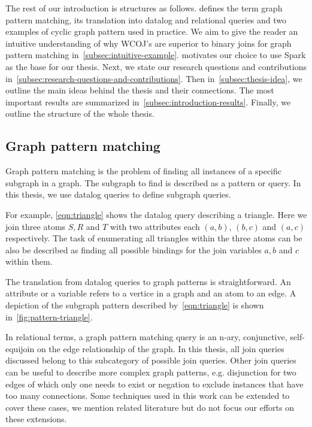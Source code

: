 The rest of our introduction is structures as follows.
 defines the term graph pattern matching, its translation into datalog and
relational queries and two examples of cyclic graph pattern used in practice.
We aim to give the reader an intuitive understanding of why \textsc{WCOJ}'s are superior to binary joins for graph pattern matching
in~\cref{subsec:intuitive-example}.
 motivates our choice to use Spark as the base for our thesis.
Next, we state our research questions and contributions in~\cref{subsec:research-questions-and-contributions}.
Then in~\cref{subsec:thesis-idea}, we outline the main ideas behind the thesis and their connections.
The most important results are summarized in~\cref{subsec:introduction-results}.
Finally, we outline the structure of the whole thesis.

\subsection{Graph pattern matching}\label{subsec:graph-pattern-matching}
Graph pattern matching is the problem of finding all instances of a specific subgraph in a graph.
The subgraph to find is described as a pattern or query.
In this thesis, we use datalog queries to define subgraph queries.

For example, \cref{eqn:triangle} shows the datalog query describing a triangle.
Here we join three atoms $S, R$ and $T$ with two attributes each $(a, b)$, $(b, c)$ and $(a, c)$ respectively.
The task of enumerating all triangles within the three atoms can be also be described as finding all possible
bindings for the join variables $a, b$ and $c$ within them.

The translation from datalog queries to graph patterns is straightforward.
An attribute or a variable refers to a vertice in a graph and an atom to an edge.
A depiction of the subgraph pattern described by~\cref{eqn:triangle} is shown in~\cref{fig:pattern-triangle}.

In relational terms, a graph pattern matching query is an n-ary, conjunctive, self-equijoin on the edge relationship of the graph.
In this thesis, all join queries discussed belong to this subcategory of possible join queries.
Other join queries can be useful to describe more complex graph patterns, e.g. disjunction for two edges of which only one needs to
exist or negation to exclude instances that have too many connections.
Some techniques used in this work can be extended to cover these cases, we mention related literature but do not focus
our efforts on these extensions.

